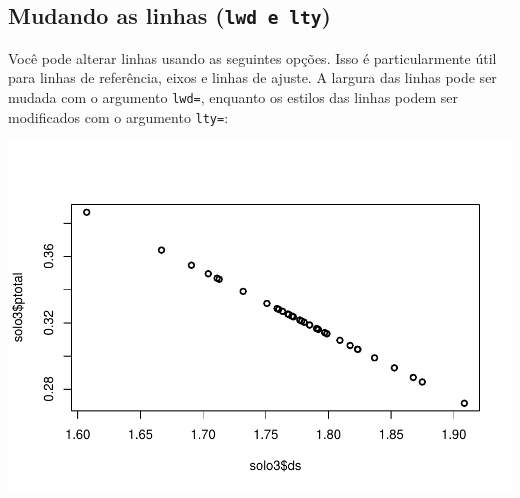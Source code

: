 \documentclass[
]{book}
\newenvironment{Shaded}{\begin{snugshade}}{\end{snugshade}}
\newcommand{\CommentTok}[1]{\textcolor[rgb]{0.56,0.35,0.01}{\textit{#1}}}
\newcommand{\DataTypeTok}[1]{\textcolor[rgb]{0.13,0.29,0.53}{#1}}
\newcommand{\DecValTok}[1]{\textcolor[rgb]{0.00,0.00,0.81}{#1}}
\newcommand{\KeywordTok}[1]{\textcolor[rgb]{0.13,0.29,0.53}{\textbf{#1}}}
\newcommand{\NormalTok}[1]{#1}
\newcommand{\OperatorTok}[1]{\textcolor[rgb]{0.81,0.36,0.00}{\textbf{#1}}}
\begin{document}
\hypertarget{mudando-as-linhas-lwd-e-lty}{%
\subsection{\texorpdfstring{Mudando as linhas (\texttt{lwd\ e\ lty})}{Mudando as linhas (lwd e lty)}}\label{mudando-as-linhas-lwd-e-lty}}

Você pode alterar linhas usando as seguintes opções. Isso é particularmente útil para linhas de referência, eixos e linhas de ajuste. A largura das linhas pode ser mudada com o argumento \texttt{lwd=}, enquanto os estilos das linhas podem ser modificados com o argumento \texttt{lty=}:

\begin{Shaded}
\end{Shaded}

\includegraphics{TudodoR_files/figure-latex/unnamed-chunk-158-1.pdf}

\begin{Shaded}
\end{Shaded}
\end{document}
